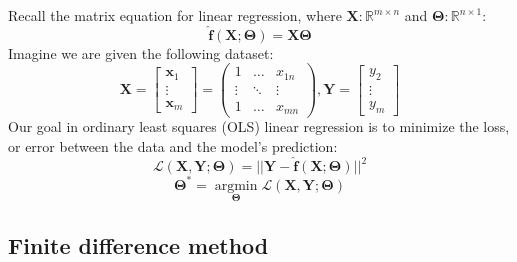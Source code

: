 \documentclass[12pt,initial,twoside,maitrise]{dms}
\numberwithin{equation}{section}
\numberwithin{table}{chapter}
\numberwithin{figure}{chapter}
\begin{document}
\noindent Recall the matrix equation for linear regression, where $\mathbf{X}: \mathbb{R}^{m \times n}$ and $\mathbf{\Theta}: \mathbb{R}^{n \times 1}$:
%
\begin{equation}
\mathbf{\hat f}(\mathbf{X}; \mathbf{\Theta}) = \mathbf{X}\mathbf{\Theta}
\end{equation}
%
Imagine we are given the following dataset:
%
\begin{equation}
\mathbf{X} =
\begin{bmatrix}
\mathbf{x}_1 \\
\vdots \\
\mathbf{x}_m
\end{bmatrix} =
\begin{pmatrix}
1 & \ldots & x_{1n} \\
\vdots & \ddots & \vdots \\
1 & \ldots & x_{mn}
\end{pmatrix},
\mathbf{Y} =
\begin{bmatrix}
y_2 \\
\vdots \\
y_m
\end{bmatrix}
\end{equation}
%
Our goal in ordinary least squares (OLS) linear regression is to minimize the loss, or error between the data and the model's prediction:
%
\begin{equation}
\mathcal{L}(\mathbf{X}, \mathbf{Y}; \mathbf{\Theta}) = ||\mathbf{Y} - \mathbf{\hat f}(\mathbf{X}; \mathbf{\Theta})||^2
\end{equation}
%
\begin{equation}
\mathbf{\Theta}^* = \underset{\mathbf{\Theta}}{\operatorname{argmin}}\mathcal{L}(\mathbf{X}, \mathbf{Y}; \mathbf{\Theta})
\end{equation}

\subsection{Finite difference method}\label{sec:fdm}
\end{document}
